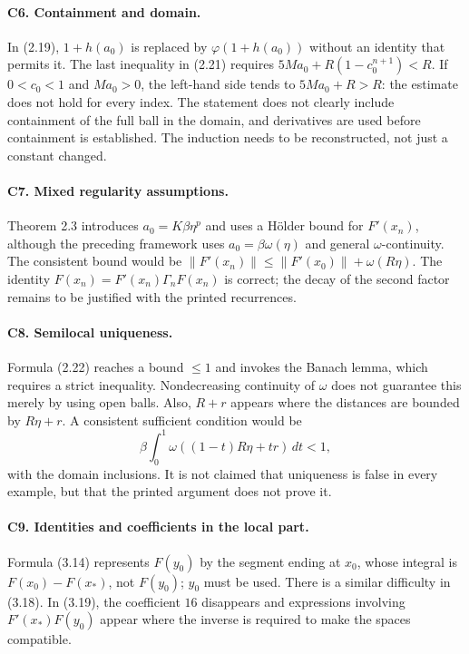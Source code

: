 \documentclass[11pt,a4paper]{article}
\numberwithin{equation}{section}
\numberwithin{table}{section}
\theoremstyle{plain}
\theoremstyle{definition}\newtheorem{definition}[theorem]{Definition}
\theoremstyle{remark}\newtheorem{remark}[theorem]{Remark}
\begin{document}
\paragraph{C6. Containment and domain.}
In (2.19), $1+h(a_0)$ is replaced by $\varphi(1+h(a_0))$ without
an identity that permits it. The last inequality in (2.21) requires
$5Ma_0+R(1-c_0^{n+1})<R$. If $0<c_0<1$ and $Ma_0>0$, the left-hand
side tends to $5Ma_0+R>R$: the estimate does not hold for every index.
The statement does not clearly include containment of the full ball
in the domain, and derivatives are used before containment is
established. The induction needs to be reconstructed, not just a
constant changed.

\paragraph{C7. Mixed regularity assumptions.}
Theorem 2.3 introduces $a_0=K\beta\eta^p$ and uses a H\"older bound
for $F'(x_n)$, although the preceding framework uses
$a_0=\beta\omega(\eta)$ and general $\omega$-continuity.
The consistent bound would be
$\|F'(x_n)\|\leq\|F'(x_0)\|+\omega(R\eta)$.
The identity $F(x_n)=F'(x_n)\Gamma_nF(x_n)$ is correct; the decay
of the second factor remains to be justified with the printed
recurrences.

\paragraph{C8. Semilocal uniqueness.}
Formula (2.22) reaches a bound $\leq1$ and invokes the Banach lemma,
which requires a strict inequality. Nondecreasing continuity of
$\omega$ does not guarantee this merely by using open balls.
Also, $R+r$ appears where the distances are bounded by $R\eta+r$.
A consistent sufficient condition would be
\[
 \beta\int_0^1\omega((1-t)R\eta+tr)\,dt<1,
\]
with the domain inclusions. It is not claimed that uniqueness is
false in every example, but that the printed argument does not
prove it.

\paragraph{C9. Identities and coefficients in the local part.}
Formula (3.14) represents $F(y_0)$ by the segment ending at $x_0$,
whose integral is $F(x_0)-F(x_*)$, not $F(y_0)$; $y_0$ must be used.
There is a similar difficulty in (3.18). In (3.19), the coefficient
$16$ disappears and expressions involving $F'(x_*)F(y_0)$ appear
where the inverse is required to make the spaces compatible.
\end{document}
